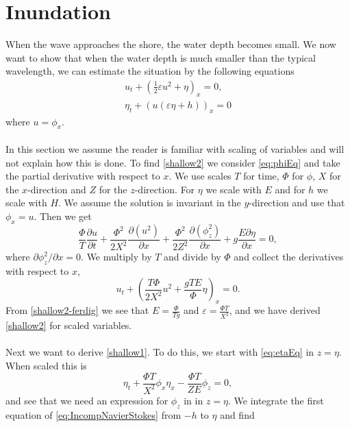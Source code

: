 \documentclass[12pt]{article}
\begin{document}
\section{Inundation}
When the wave approaches the shore, the water depth becomes small. We now want to show that when the water depth is much smaller than the typical wavelength, we can estimate the situation by the following equations 
\begin{align}
u_t + \left(\frac{1}{2}\varepsilon u^2 + \eta\right)_x = 0, \label{shallow2}\\
\eta_t + (u(\varepsilon\eta + h))_x = 0 \label{shallow1}  
\end{align}
where $u = \phi_x$. \\
\\
In this section we assume the reader is familiar with scaling of variables and will not explain how this is done. To find \eqref{shallow2} we consider \eqref{eq:phiEq} and take the partial derivative with respect to $x$.
We use scales $T$ for time, $\Phi$ for $\phi$, $X$ for the $x$-direction and $Z$ for the $z$-direction. For $\eta$ we scale with $E$ and for $h$ we scale with $H$. We assume the solution is invariant in the $y$-direction
and use that $\phi_x=u$. Then we get 
\begin{equation*}
\frac{\Phi}{T}\frac{\partial u}{\partial t} + \frac{\Phi^2}{2X^2}\frac{\partial (u^2)}{\partial x}+ \frac{\Phi^2}{2Z^2}\frac{\partial(\phi_z^2)}{\partial x} + g\frac{E \partial \eta}{\partial x} = 0,
\end{equation*}
where $\partial\phi_z^2/\partial x=0$. We multiply by $T$ and divide by $\Phi$ and collect the derivatives with respect to $x$,
\begin{equation}
    \label{shallow2-ferdig}
    u_t + \left(\frac{T\Phi}{2X^2}u^2 + \frac{gTE}{\Phi}\eta\right)_x = 0.
\end{equation}
From \eqref{shallow2-ferdig} we see that $E = \frac{\Phi}{T g}$ and $\varepsilon =\frac{\Phi T}{X^2}$, and we have derived \eqref{shallow2} for scaled variables.\\
\\
Next we want to derive \eqref{shallow1}. To do this, we start with \eqref{eq:etaEq} in $z = \eta$. When scaled this is 
\begin{equation}
    \label{eta_t..}
    \eta_t + \frac{\Phi T}{X^2}\phi_x\eta_x - \frac{\Phi T}{ZE}\phi_z = 0,
\end{equation}
and see that we need an expression for $\phi_z$ in in $z = \eta$. We integrate the first equation of \eqref{eq:IncompNavierStokes} from $-h$ to $\eta$ and find 
\end{document}
